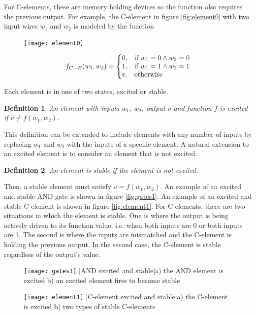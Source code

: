 \documentclass[12pt]{report}
\newtheorem*{definition}{Definition}
\begin{document}
For C-elements, these are memory holding devices so the function also requires the previous output.  For example, the C-element in figure \ref{fig:element0} with two input wires $w_1$ and $w_2$ is modeled by the function\\
\begin{figure}[h]
\centering
\texttt{[image: element0]}
\end{figure}
\[
f_{C-E}(w_1,w_2) =\left\{
  \begin{array}{@{}ll@{}}
    0, & \text{if}\ w_1=0 \wedge w_2=0\\
    1, & \text{if}\ w_1=1 \wedge w_2=1\\
    v, & \text{otherwise}

  \end{array}\right. 
\]

Each element is in one of two states, excited or stable.  
\begin{definition}
An element with inputs $w_1$, $w_2$, output $v$ and function $f$ is {\em excited} if $v\neq f(w_1,w_2)$.  
\end{definition}
This definition can be extended to include elements with any number of inputs by replacing $w_1$ and $w_2$ with the inputs of a specific element.  A natural extension to an excited element is to consider an element that is not excited.
\begin{definition} 
An element is stable if the element is not excited.
\end{definition}
Then, a stable element must satisfy $v= f(w_1,w_2)$.  An example of an excited and stable AND gate is shown in figure \ref{fig:gates1}.  An example of an excited and stable C-element is shown in figure \ref{fig:element1}.  For C-elements, there are two situations in which the element is stable.  One is where the output is being actively driven to its function value, i.e. when both inputs are 0 or both inputs are 1.  The second is where the inputs are mismatched and the C-element is holding the previous output.  In the second case, the C-element is stable regardless of the output's value.

\begin{figure}[h]
\centering
\texttt{[image: gates1]}
[AND excited and stable]{a) the AND element is excited  b) an excited element fires to become stable}
\end{figure}
\begin{figure}[h]
\centering
\texttt{[image: element1]}
[C-element excited and stable]{a) the C-element is excited  b) two types of stable C-elements}
\end{figure}
\end{document}
